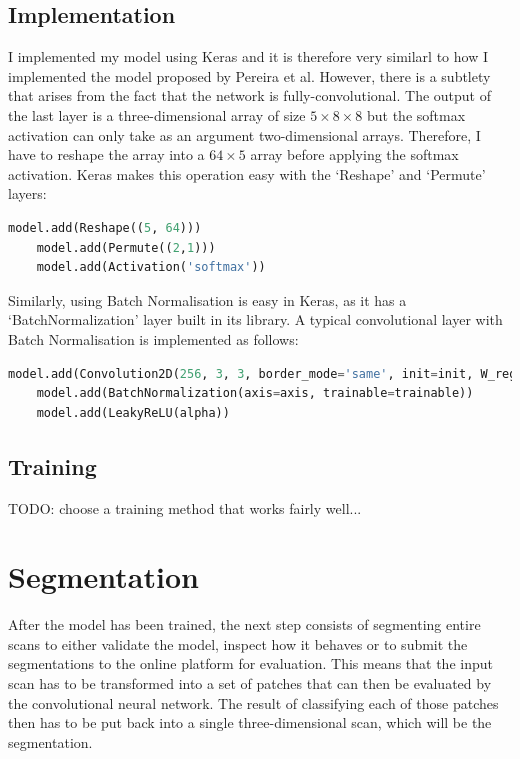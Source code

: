 \documentclass[12pt,a4paper,twoside,openright]{report}
\begin{document}
\subsection{Implementation}
I implemented my model using Keras and it is therefore very similarl to how I implemented the model proposed by Pereira et al. However, there is a subtlety that arises from the fact that the network is fully-convolutional. The output of the last layer is a three-dimensional array of size $5 \times 8 \times 8$ but the softmax activation can only take as an argument two-dimensional arrays. Therefore, I have to reshape the array into a $64 \times 5$ array before applying the softmax activation. Keras makes this operation easy with the `Reshape' and `Permute' layers:
\begin{lstlisting}[language=Python]
	model.add(Reshape((5, 64)))
	model.add(Permute((2,1)))
	model.add(Activation('softmax'))
\end{lstlisting}

Similarly, using Batch Normalisation is easy in Keras, as it has a `BatchNormalization' layer built in its library. A typical convolutional layer with Batch Normalisation is implemented as follows:
\begin{lstlisting}[language=Python]
	model.add(Convolution2D(256, 3, 3, border_mode='same', init=init, W_regularizer=l2(l)))
	model.add(BatchNormalization(axis=axis, trainable=trainable))
	model.add(LeakyReLU(alpha))
\end{lstlisting}

\subsection{Training}
TODO: choose a training method that works fairly well...

\section{Segmentation}
After the model has been trained, the next step consists of segmenting entire scans to either validate the model, inspect how it behaves or to submit the segmentations to the online platform for evaluation. This means that the input scan has to be transformed into a set of patches that can then be evaluated by the convolutional neural network. The result of classifying each of those patches then has to be put back into a single three-dimensional scan, which will be the segmentation.
\end{document}
